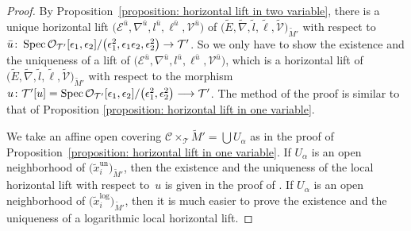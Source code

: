 \documentclass[pdftex]{sigma}
\numberwithin{equation}{section}
\newcommand\Spec{\mathop{\rm Spec}\nolimits}
\begin{document}
\begin{proof}By Proposition~\ref{proposition: horizontal lift in two variable},
there is a unique horizontal lift
$\big({\mathcal E}^{\bar{u}}\! ,\nabla^{\bar{u}} \! ,l^{\bar{u}} \! ,\ell^{\bar{u}} \! ,{\mathcal V}^{\bar{u}}\big)$
of
$\big(\tilde{E},\tilde{\nabla},\tilde{l},\tilde{\ell},\tilde{\mathcal V}\big)_{\tilde{M}'}$
with respect to
$\bar{u}\colon \Spec {\mathcal O}_{\mathcal T'}[\epsilon_1,\epsilon_2]
 /\big(\epsilon_1^2,\epsilon_1\epsilon_2,\epsilon_2^2\big)
 \rightarrow {\mathcal T'}$.
So we only have to show the existence and the uniqueness of a lift of
$\big({\mathcal E}^{\bar{u}},\nabla^{\bar{u}},l^{\bar{u}},\ell^{\bar{u}},{\mathcal V}^{\bar{u}}\big)$,
which is a horizontal lift of
$\big(\tilde{E},\tilde{\nabla},\tilde{l},\tilde{\ell},\tilde{\mathcal V}\big)_{\tilde{M}'}$
with respect to the morphism
$u\colon {\mathcal T'}[u]=\Spec {\mathcal O}_{\mathcal T'}[\epsilon_1,\epsilon_2]
 /\big(\epsilon_1^2,\epsilon_2^2\big)
 \longrightarrow {\mathcal T'}$.
The method of the proof is similar to that of
Proposition \ref{proposition: horizontal lift in one variable}.

We take an affine open covering
${\mathcal C}\times_{\mathcal T}\tilde{M}'
=\bigcup U_{\alpha}$
as in the proof of Proposition~\ref{proposition: horizontal lift in one variable}.
If $U_{\alpha}$ is an open neighborhood of $\big(\tilde{x}_i^{\mathrm{un}}\big)_{\tilde{M}'}$,
then the existence and the uniqueness of the local horizontal lift
with respect to~$u$ is given in the proof of \cite[Lemma~5.5]{Inaba-3}.
If $U_{\alpha}$ is an open neighborhood of
$\big(\tilde{x}_i^{\mathrm{log}}\big)_{\tilde{M}'}$,
then it is much easier to prove the existence and the uniqueness of
a logarithmic local horizontal lift.


\end{proof}
\end{document}
